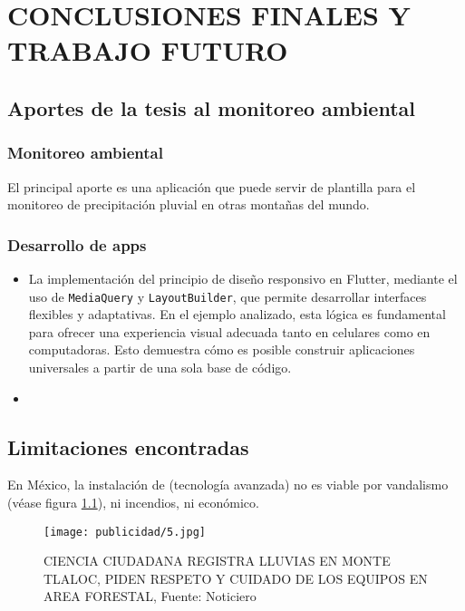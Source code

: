 \chapter{CONCLUSIONES FINALES Y TRABAJO FUTURO}



\section{Aportes de la tesis al monitoreo ambiental}
\subsection{Monitoreo ambiental}

El principal aporte es una aplicación que puede servir de plantilla para el monitoreo de precipitación pluvial en otras montañas del mundo.


\subsection{Desarrollo de apps}

\begin{itemize}
  \item La implementación del principio de diseño responsivo en Flutter, mediante el uso de \texttt{MediaQuery} y \texttt{LayoutBuilder}, que permite desarrollar interfaces flexibles y adaptativas. En el ejemplo analizado, esta lógica es fundamental para ofrecer una experiencia visual adecuada tanto en celulares como en computadoras. Esto demuestra cómo es posible construir aplicaciones universales a partir de una sola base de código.
  \item 

\end{itemize}
\section{Limitaciones encontradas}

En México, la instalación de (tecnología avanzada) no es viable por vandalismo (véase figura \ref{publicidad5}), ni incendios, ni económico.


\begin{figure}[h!]
\centering
  \texttt{[image: publicidad/5.jpg]}
  \caption{CIENCIA CIUDADANA REGISTRA LLUVIAS EN MONTE TLALOC, PIDEN RESPETO Y
  CUIDADO DE LOS EQUIPOS EN AREA FORESTAL, Fuente: Noticiero}
  \label{publicidad5}
\end{figure}

